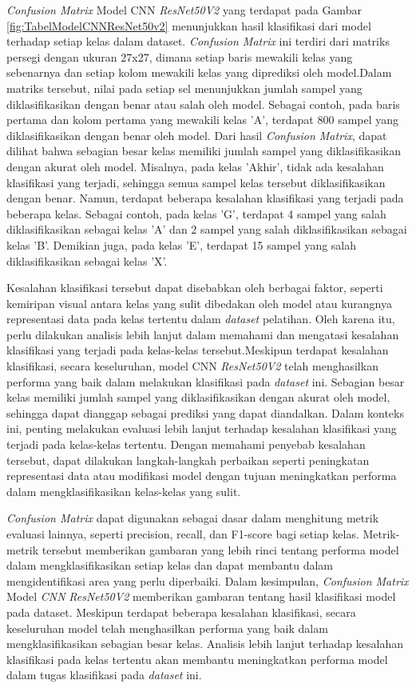 \textit{Confusion Matrix} Model CNN \textit{ResNet50V2} yang terdapat pada Gambar \ref{fig:TabelModelCNNResNet50v2} menunjukkan hasil klasifikasi dari model terhadap setiap kelas dalam dataset. \textit{Confusion Matrix} ini terdiri dari matriks persegi dengan ukuran 27x27, dimana setiap baris mewakili kelas yang sebenarnya dan setiap kolom mewakili kelas yang diprediksi oleh model.Dalam matriks tersebut, nilai pada setiap sel menunjukkan jumlah sampel yang diklasifikasikan dengan benar atau salah oleh model. Sebagai contoh, pada baris pertama dan kolom pertama yang mewakili kelas 'A', terdapat 800 sampel yang diklasifikasikan dengan benar oleh model. Dari hasil \textit{Confusion Matrix}, dapat dilihat bahwa sebagian besar kelas memiliki jumlah sampel yang diklasifikasikan dengan akurat oleh model. Misalnya, pada kelas 'Akhir', tidak ada kesalahan klasifikasi yang terjadi, sehingga semua sampel kelas tersebut diklasifikasikan dengan benar. Namun, terdapat beberapa kesalahan klasifikasi yang terjadi pada beberapa kelas. Sebagai contoh, pada kelas 'G', terdapat 4 sampel yang salah diklasifikasikan sebagai kelas 'A' dan 2 sampel yang salah diklasifikasikan sebagai kelas 'B'. Demikian juga, pada kelas 'E', terdapat 15 sampel yang salah diklasifikasikan sebagai kelas 'X'.

Kesalahan klasifikasi tersebut dapat disebabkan oleh berbagai faktor, seperti kemiripan visual antara kelas yang sulit dibedakan oleh model atau kurangnya representasi data pada kelas tertentu dalam \textit{dataset} pelatihan. Oleh karena itu, perlu dilakukan analisis lebih lanjut dalam memahami dan mengatasi kesalahan klasifikasi yang terjadi pada kelas-kelas tersebut.Meskipun terdapat kesalahan klasifikasi, secara keseluruhan, model CNN \textit{ResNet50V2} telah menghasilkan performa yang baik dalam melakukan klasifikasi pada \textit{dataset} ini. Sebagian besar kelas memiliki jumlah sampel yang diklasifikasikan dengan akurat oleh model, sehingga dapat dianggap sebagai prediksi yang dapat diandalkan.
Dalam konteks ini, penting melakukan evaluasi lebih lanjut terhadap kesalahan klasifikasi yang terjadi pada kelas-kelas tertentu. Dengan memahami penyebab kesalahan tersebut, dapat dilakukan langkah-langkah perbaikan seperti peningkatan representasi data atau modifikasi model dengan tujuan meningkatkan performa dalam mengklasifikasikan kelas-kelas yang sulit.

\textit{Confusion Matrix} dapat digunakan sebagai dasar dalam menghitung metrik evaluasi lainnya, seperti precision, recall, dan F1-score bagi setiap kelas. Metrik-metrik tersebut memberikan gambaran yang lebih rinci tentang performa model dalam mengklasifikasikan setiap kelas dan dapat membantu dalam mengidentifikasi area yang perlu diperbaiki.
Dalam kesimpulan, \textit{Confusion Matrix} Model \textit{CNN} \textit{ResNet50V2} memberikan gambaran tentang hasil klasifikasi model pada dataset. Meskipun terdapat beberapa kesalahan klasifikasi, secara keseluruhan model telah menghasilkan performa yang baik dalam mengklasifikasikan sebagian besar kelas. Analisis lebih lanjut terhadap kesalahan klasifikasi pada kelas tertentu akan membantu meningkatkan performa model dalam tugas klasifikasi pada \textit{dataset} ini.

